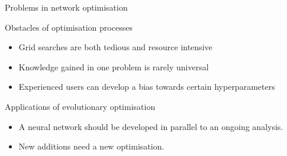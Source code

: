 \begin{frame}{Problems in network optimisation}
    \begin{block}{Obstacles of optimisation processes}
        \begin{itemize}
            \item Grid searches are both tedious and resource intensive
            \item Knowledge gained in one problem is rarely universal
            \item Experienced users can develop a bias towards certain hyperparameters
        \end{itemize}
    \end{block}
    \begin{block}{Applications of evolutionary optimisation}
        \begin{itemize}
            \item A neural network should be developed in parallel to an ongoing analysis.
            \item New additions need a new optimisation.
        \end{itemize}
    \end{block}
\end{frame}


